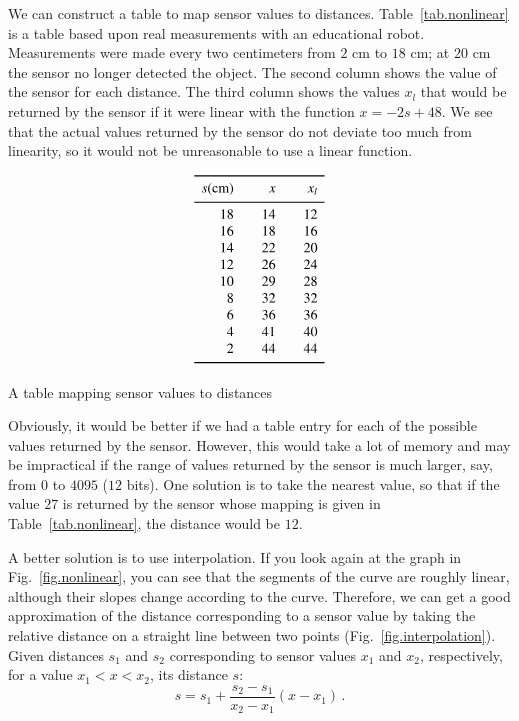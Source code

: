 We can construct a table to map sensor values to distances. Table~\ref{tab.nonlinear} is a table based upon real measurements with an educational robot. Measurements were made every two centimeters from $2$ cm to $18$ cm; at $20$ cm the sensor no longer detected the object. The second column shows the value of the sensor for each distance. The third column shows the values $x_l$ that would be returned by the sensor if it were linear with the function $x=-2s+48$. We see that the actual values returned by the sensor do not deviate too much from linearity, so it would not be unreasonable to use a linear function.

\begin{table}
\begin{displaymath}
\begin{array}{r@{\hspace{2em}}r@{\hspace{2em}}r}
\svhline\noalign{\smallskip}
s \textrm{(cm)} & x & x_l\\
\noalign{\smallskip}\svhline\noalign{\smallskip}
18 &14 & 12\\
16 &18 & 16\\
 14&22 & 20\\
 12&26 & 24\\
 10&29 & 28\\
 8 &32 & 32\\
 6 &36 & 36\\
 4 &41 & 40\\
 2 &44 & 44\\
\noalign{\smallskip}\svhline\noalign{\smallskip}
\end{array}
\end{displaymath}
\caption{A table mapping sensor values to distances}\label{tab.nonlinear}
\end{table}


Obviously, it would be better if we had a table entry for each of the possible values returned by the sensor. However, this would take a lot of memory and may be impractical if the range of values returned by the sensor is much larger, say, from $0$ to $4095$ ($12$ bits). One solution is to take the nearest value, so that if the value $27$ is returned by the sensor whose mapping is given in Table~\ref{tab.nonlinear}, the distance would be $12$.

A better solution is to use interpolation. If you look again at the graph in Fig.~\ref{fig.nonlinear}, you can see that the segments of the curve are roughly linear, although their slopes change according to the curve. Therefore, we can get a good approximation of the distance corresponding to a sensor value by taking the relative distance on a straight line between two points (Fig.~\ref{fig.interpolation}). Given distances $s_1$ and $s_2$ corresponding to sensor values $x_1$ and $x_2$, respectively, for a value $x_1<x<x_2$, its distance $s$:
\[
s = s_1 + \frac{s_2-s_1}{x_2-x_1}(x-x_1)\,.
\]

